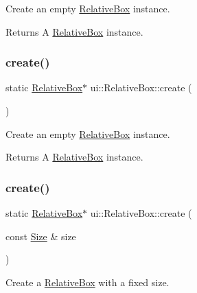 Create an empty \hyperlink{classui_1_1RelativeBox}{Relative\+Box} instance. \begin{DoxyReturn}{Returns}
A \hyperlink{classui_1_1RelativeBox}{Relative\+Box} instance. 
\end{DoxyReturn}
\mbox{\label{classui_1_1RelativeBox_adfbee03fc12edd6b8670bd2904531e7d}} 
\subsubsection{\texorpdfstring{create()}{create()}\hspace{0.1cm}{\footnotesize\ttfamily [2/4]}}
{\footnotesize\ttfamily static \hyperlink{classui_1_1RelativeBox}{Relative\+Box}$\ast$ ui\+::\+Relative\+Box\+::create (\begin{DoxyParamCaption}{ }\end{DoxyParamCaption})\hspace{0.3cm}{\ttfamily [static]}}

Create an empty \hyperlink{classui_1_1RelativeBox}{Relative\+Box} instance. \begin{DoxyReturn}{Returns}
A \hyperlink{classui_1_1RelativeBox}{Relative\+Box} instance. 
\end{DoxyReturn}
\mbox{\label{classui_1_1RelativeBox_a2e368badd32439b98017bcd362e5c413}} 
\subsubsection{\texorpdfstring{create()}{create()}\hspace{0.1cm}{\footnotesize\ttfamily [3/4]}}
{\footnotesize\ttfamily static \hyperlink{classui_1_1RelativeBox}{Relative\+Box}$\ast$ ui\+::\+Relative\+Box\+::create (\begin{DoxyParamCaption}\item[{const \hyperlink{classSize}{Size} \&}]{size }\end{DoxyParamCaption})\hspace{0.3cm}{\ttfamily [static]}}



Create a \hyperlink{classui_1_1RelativeBox}{Relative\+Box} with a fixed size. 


